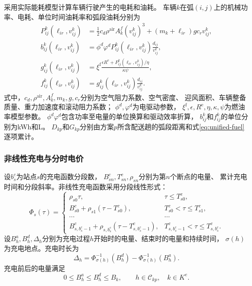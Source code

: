 \documentclass{setp-new}
\begin{document}
采用实际能耗模型计算车辆行驶产生的电耗和油耗\cite{ref:23}。
车辆$k$在弧$(i,j)$上的机械功率、电耗、单位时间油耗率和弧段油耗分别为
\begin{align}
P_{ij}^{k}(\ell_{ir},v_{ij}^{k})
&=\frac{1}{2}c_d\rho^{\mathrm{air}}A_k^{f}(v_{ij}^{k})^3
+(m_k+\ell_{ir})gc_rv_{ij}^{k},
\label{eq:unified-power}\\
b_{ij}^{k}(\ell_{ir},v_{ij}^{k})
&=\phi^{d}\varphi^{d}P_{ij}^{k}(\ell_{ir},v_{ij}^{k})
\frac{d_{ij}}{v_{ij}^{k}},
\label{eq:unified-electricity}\\
g_{ij}^{k}(\ell_{ir},v_{ij}^{k})
&=\xi^{\mathrm f}\frac{\epsilon R^{\mathrm e}
+P_{ij}^{k}(\ell_{ir},v_{ij}^{k})/\eta}{\kappa\psi},
\label{eq:unified-fuel-rate}\\
f_{ij}^{k}(\ell_{ir},v_{ij}^{k})
&=g_{ij}^{k}(\ell_{ir},v_{ij}^{k})\frac{d_{ij}}{v_{ij}^{k}}.
\label{eq:unified-fuel}
\end{align}
式中，$c_d,\rho^{\mathrm{air}},A_k^{f},m_k,g,c_r$分别为空气阻力系数、空气密度、
迎风面积、车辆整备质量、重力加速度和滚动阻力系数；
$\phi^{d},\varphi^{d}$为电驱动参数，
$\xi^{\mathrm f},\epsilon,R^{\mathrm e},\eta,\kappa,\psi$为燃油率模型参数。
$\phi^{d}\varphi^{d}$包含功率至电量的单位换算和驱动效率折算，
$b_{ij}^{k}$和$f_{ij}^{k}$的单位分别为kWh和L。
$D_{kp}$和$G_{kp}$分别由方案$p$所含配送趟的弧段距离和式\eqref{eq:unified-fuel}逐项累计。

\subsubsection{非线性充电与分时电价}

设$b_s^{c}$为站点$s$的充电函数分段数，
$B_{sn}^{c},T_{sn}^{c},\rho_{sn}$分别为第$n$个断点的电量、
累计充电时间和分段斜率。非线性充电函数采用分段线性形式\cite{ref:94}：
\begin{equation}
\Phi_s(\tau)=
\begin{cases}
\rho_{s0}\tau, & \tau\le T_{s0}^{c},\\
B_{s0}^{c}+\rho_{s1}(\tau-T_{s0}^{c}),
& T_{s0}^{c}<\tau\le T_{s1}^{c},\\
\cdots & \cdots\\
B_{s,b_s^{c}-1}^{c}+\rho_{s,b_s^{c}}(\tau-T_{s,b_s^{c}-1}^{c}),
& T_{s,b_s^{c}-1}^{c}<\tau\le T_{s,b_s^{c}}^{c}.
\end{cases}
\label{eq:unified-charge-function}
\end{equation}
设$B_h^{a},B_h^{d},\Delta_h$分别为充电过程$h$开始时的电量、结束时的电量和持续时间，
$\sigma(h)$为充电地点。充电时长为\cite{ref:montoya}
\begin{equation}
\Delta_h=
\Phi_{\sigma(h)}^{-1}(B_h^{d})-
\Phi_{\sigma(h)}^{-1}(B_h^{a}).
\label{eq:unified-charge-duration}
\end{equation}
充电前后的电量满足
\begin{equation}
0\le B_h^{a}\le B_h^{d}\le B_k,
\qquad h\in\mathcal C_{kp},\quad k\in K^{e}.
\label{eq:unified-charge-energy-bound}
\end{equation}
\end{document}

